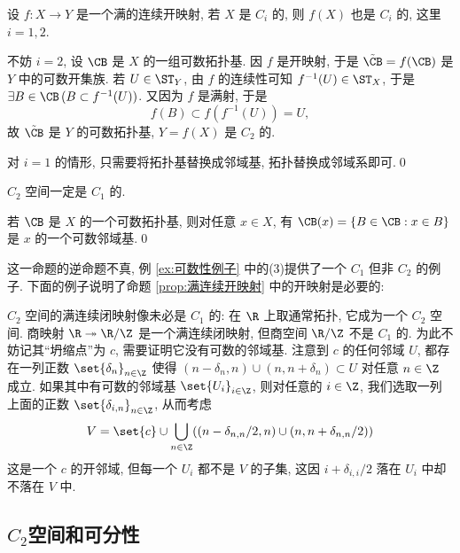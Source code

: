     \begin{Proposition}\label{prop:满连续开映射}
        设 $ f : X\to Y $ 是一个满的连续开映射, 若 $ X $ 是 $ C_i $ 的, 则 $ f(X) $ 也是 $ C_i $ 的, 这里 $ i=1,2 $.
    \end{Proposition}
    \begin{Proof}
        不妨 $ i=2 $, 设 $ \CB $ 是 $ X $ 的一组可数拓扑基. 因 $ f $ 是开映射, 于是 $ \tilde{\CB}=f(\CB) $ 是 $ Y $ 中的可数开集族. 若 $ U\in\ST_Y $, 由 $ f $ 的连续性可知 $ f^{-1}(U)\in\ST_X $, 于是 $ \exists B\in\CB\,(B\subset f^{-1}(U)) $. 又因为 $ f $ 是满射, 于是
        \[
            f(B)\subset f(f^{-1}(U))=U,
        \]
        故 $ \tilde{\CB} $ 是 $ Y $ 的可数拓扑基, $ Y=f(X) $ 是 $ C_2 $ 的.

        对 $ i=1 $ 的情形, 只需要将拓扑基替换成邻域基, 拓扑替换成邻域系即可.\qed
    \end{Proof}

    \begin{Proposition}
        $ C_2 $ 空间一定是 $ C_1 $ 的.
    \end{Proposition}
    \begin{Proof}
        若 $ \CB $ 是 $ X $ 的一个可数拓扑基, 则对任意 $ x\in X $, 有 $ \CB(x)=\{B\in\CB : x\in B\} $ 是 $ x $ 的一个可数邻域基.\qed
    \end{Proof}

    这一命题的逆命题不真, 例 \ref{ex:可数性例子} 中的(3)提供了一个 $ C_1 $ 但非 $ C_2 $ 的例子. 下面的例子说明了命题 \ref{prop:满连续开映射} 中的开映射是必要的:

    \begin{Example}
        $ C_2 $ 空间的满连续闭映射像未必是 $ C_1 $ 的: 在 $ \R $ 上取通常拓扑, 它成为一个 $ C_2 $ 空间. 商映射 $ \R\twoheadrightarrow\R/\Z $ 是一个满连续闭映射, 但商空间 $ \R/\Z $ 不是 $ C_1 $ 的. 为此不妨记其``坍缩点''为 $ c $, 需要证明它没有可数的邻域基. 注意到 $ c $ 的任何邻域 $ U $, 都存在一列正数 $ \set{\delta_n}_{n\in\Z} $ 使得 $ (n-\delta_n,n)\cup(n,n+\delta_n)\subset U $ 对任意 $ n\in\Z $ 成立. 如果其中有可数的邻域基 $ \set{U_i}_{i\in\Z} $, 则对任意的 $ i\in\Z $, 我们选取一列上面的正数 $ \set{\delta_{i,n}}_{n\in\Z} $, 从而考虑
        \[
            V=\set{c}\cup\bigcup_{n\in\Z}((n-\delta_{n,n}/2,n)\cup(n,n+\delta_{n,n}/2))
        \]
        这是一个 $ c $ 的开邻域, 但每一个 $ U_i $ 都不是 $ V $ 的子集, 这因 $ i+\delta_{i,i}/2 $ 落在 $ U_i $ 中却不落在 $ V $ 中.
    \end{Example}

\subsection{$ C_2 $空间和可分性}


